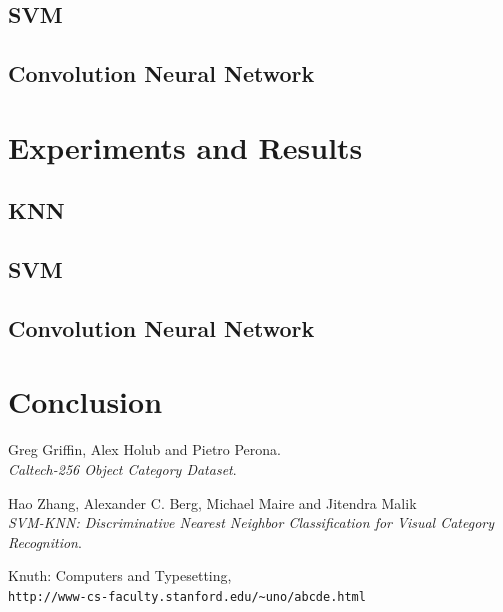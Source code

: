 \documentclass{article} %
\begin{document}
\subsection{SVM}


\subsection{Convolution Neural Network}


\section{Experiments and Results}

\subsection{KNN}


\subsection{SVM}


\subsection{Convolution Neural Network}



\section{Conclusion}




\begin{thebibliography}{9}

Greg Griffin, Alex Holub and Pietro Perona. \\
\textit{Caltech-256 Object Category Dataset}. 
 
Hao Zhang, Alexander C. Berg, Michael Maire and Jitendra Malik \\
\textit{SVM-KNN: Discriminative Nearest Neighbor Classification for Visual Category
Recognition}.

 
Knuth: Computers and Typesetting,
\\\texttt{http://www-cs-faculty.stanford.edu/\~{}uno/abcde.html}
\end{thebibliography}
\end{document}

